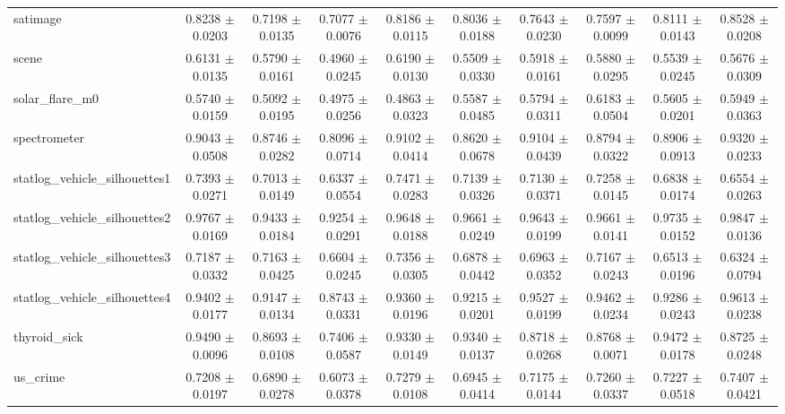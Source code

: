 \begin{table*}[htbp]
\begin{tabular}{lccccccccc}
            satimage & 0.8238 $\pm$ 0.0203 & 0.7198 $\pm$ 0.0135 & 0.7077 $\pm$ 0.0076 & 0.8186 $\pm$ 0.0115 & 0.8036 $\pm$ 0.0188 & 0.7643 $\pm$ 0.0230 & 0.7597 $\pm$ 0.0099 & 0.8111 $\pm$ 0.0143 & 0.8528 $\pm$ 0.0208 \\ 
            scene & 0.6131 $\pm$ 0.0135 & 0.5790 $\pm$ 0.0161 & 0.4960 $\pm$ 0.0245 & 0.6190 $\pm$ 0.0130 & 0.5509 $\pm$ 0.0330 & 0.5918 $\pm$ 0.0161 & 0.5880 $\pm$ 0.0295 & 0.5539 $\pm$ 0.0245 & 0.5676 $\pm$ 0.0309 \\ 
            solar\_flare\_m0 & 0.5740 $\pm$ 0.0159 & 0.5092 $\pm$ 0.0195 & 0.4975 $\pm$ 0.0256 & 0.4863 $\pm$ 0.0323 & 0.5587 $\pm$ 0.0485 & 0.5794 $\pm$ 0.0311 & 0.6183 $\pm$ 0.0504 & 0.5605 $\pm$ 0.0201 & 0.5949 $\pm$ 0.0363 \\ 
            spectrometer & 0.9043 $\pm$ 0.0508 & 0.8746 $\pm$ 0.0282 & 0.8096 $\pm$ 0.0714 & 0.9102 $\pm$ 0.0414 & 0.8620 $\pm$ 0.0678 & 0.9104 $\pm$ 0.0439 & 0.8794 $\pm$ 0.0322 & 0.8906 $\pm$ 0.0913 & 0.9320 $\pm$ 0.0233 \\ 
            statlog\_vehicle\_silhouettes1 & 0.7393 $\pm$ 0.0271 & 0.7013 $\pm$ 0.0149 & 0.6337 $\pm$ 0.0554 & 0.7471 $\pm$ 0.0283 & 0.7139 $\pm$ 0.0326 & 0.7130 $\pm$ 0.0371 & 0.7258 $\pm$ 0.0145 & 0.6838 $\pm$ 0.0174 & 0.6554 $\pm$ 0.0263 \\ 
            statlog\_vehicle\_silhouettes2 & 0.9767 $\pm$ 0.0169 & 0.9433 $\pm$ 0.0184 & 0.9254 $\pm$ 0.0291 & 0.9648 $\pm$ 0.0188 & 0.9661 $\pm$ 0.0249 & 0.9643 $\pm$ 0.0199 & 0.9661 $\pm$ 0.0141 & 0.9735 $\pm$ 0.0152 & 0.9847 $\pm$ 0.0136 \\ 
            statlog\_vehicle\_silhouettes3 & 0.7187 $\pm$ 0.0332 & 0.7163 $\pm$ 0.0425 & 0.6604 $\pm$ 0.0245 & 0.7356 $\pm$ 0.0305 & 0.6878 $\pm$ 0.0442 & 0.6963 $\pm$ 0.0352 & 0.7167 $\pm$ 0.0243 & 0.6513 $\pm$ 0.0196 & 0.6324 $\pm$ 0.0794 \\ 
            statlog\_vehicle\_silhouettes4 & 0.9402 $\pm$ 0.0177 & 0.9147 $\pm$ 0.0134 & 0.8743 $\pm$ 0.0331 & 0.9360 $\pm$ 0.0196 & 0.9215 $\pm$ 0.0201 & 0.9527 $\pm$ 0.0199 & 0.9462 $\pm$ 0.0234 & 0.9286 $\pm$ 0.0243 & 0.9613 $\pm$ 0.0238 \\ 
            thyroid\_sick & 0.9490 $\pm$ 0.0096 & 0.8693 $\pm$ 0.0108 & 0.7406 $\pm$ 0.0587 & 0.9330 $\pm$ 0.0149 & 0.9340 $\pm$ 0.0137 & 0.8718 $\pm$ 0.0268 & 0.8768 $\pm$ 0.0071 & 0.9472 $\pm$ 0.0178 & 0.8725 $\pm$ 0.0248 \\ 
            us\_crime & 0.7208 $\pm$ 0.0197 & 0.6890 $\pm$ 0.0278 & 0.6073 $\pm$ 0.0378 & 0.7279 $\pm$ 0.0108 & 0.6945 $\pm$ 0.0414 & 0.7175 $\pm$ 0.0144 & 0.7260 $\pm$ 0.0337 & 0.7227 $\pm$ 0.0518 & 0.7407 $\pm$ 0.0421 \\ 

\end{tabular}
\end{table*}

